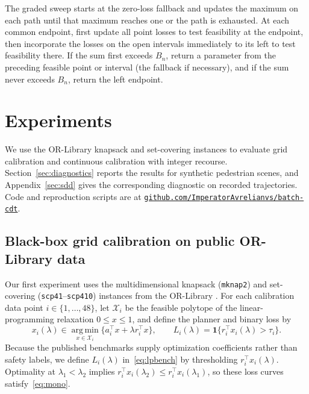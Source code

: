 \documentclass[a4paper,10pt]{article}
\theoremstyle{plain}
\theoremstyle{remark}
\begin{document}
The graded sweep starts at the zero-loss fallback and updates the maximum on each path until that maximum reaches one or the path is exhausted. At each common endpoint, first update all point losses to test feasibility at the endpoint, then incorporate the losses on the open intervals immediately to its left to test feasibility there. If the sum first exceeds $B_n$, return a parameter from the preceding feasible point or interval (the fallback if necessary), and if the sum never exceeds $B_n$, return the left endpoint.

\section{Experiments}\label{sec:expt}

We use the OR-Library knapsack and set-covering instances \cite{orlib,beasley87} to evaluate grid calibration and continuous calibration with integer recourse. Section~\ref{sec:diagnostics} reports the results for synthetic pedestrian scenes, and Appendix~\ref{sec:sdd} gives the corresponding diagnostic on recorded trajectories. Code and reproduction scripts are at \href{https://github.com/ImperatorAvrelianvs/batch-cdt}{\texttt{github.com/ImperatorAvrelianvs/batch-cdt}}.

\subsection{Black-box grid calibration on public OR-Library data}\label{sec:public}

Our first experiment uses the multidimensional knapsack (\texttt{mknap2}) and set-covering (\texttt{scp41}--\texttt{scp410}) instances from the OR-Library \cite{orlib,beasley87}. For each calibration data point $i\in\{1,\ldots,48\}$, let $\mathcal X_i$ be the feasible polytope of the linear-programming relaxation $0\le x\le 1$, and define the planner and binary loss by
\begin{equation}\label{eq:lpbench}
 x_i(\lambda)\in\operatorname*{arg\,min}_{x\in\mathcal X_i}
 \bigl\{a_i^\top x+\lambda r_i^\top x\bigr\},\qquad
 L_i(\lambda)=\mathbf 1\bigl\{r_i^\top x_i(\lambda)>\tau_i\bigr\}.
\end{equation}
Because the published benchmarks supply optimization coefficients rather than safety labels, we define $L_i(\lambda)$ in~\eqref{eq:lpbench} by thresholding $r_i^\top x_i(\lambda)$. Optimality at $\lambda_1<\lambda_2$ implies $r_i^\top x_i(\lambda_2)\le r_i^\top x_i(\lambda_1)$, so these loss curves satisfy~\eqref{eq:mono}.
\end{document}
